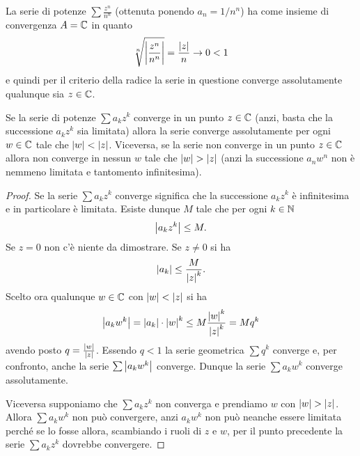\begin{example}
\label{ex:477474}
La serie di potenze $\sum \frac{z^n}{n^n}$ (ottenuta ponendo $a_n=1/n^n$)
ha come insieme di convergenza $A={\mathbb C}$
in quanto
\[
\sqrt[n]{{\left|\frac{z^n}{n^n}\right|}} = \frac{{\left|z\right|}}{n} \to 0 < 1
\]
e quindi per il criterio della radice la serie in questione converge assolutamente
qualunque sia $z\in {\mathbb C}$.
\end{example}

\begin{theorem}
\mymark{***}%
Se la serie di potenze $\sum a_k z^k$ converge in un punto $z\in {\mathbb C}$
(anzi, basta che la successione $a_k z^k$ sia limitata)
allora la serie
converge assolutamente per ogni $w\in {\mathbb C}$ tale che ${\left|w\right|}< {\left|z\right|}$.
Viceversa, se la serie non converge in un punto $z\in {\mathbb C}$
allora
non  converge in nessun $w$ tale che ${\left|w\right|} > {\left|z\right|}$ (anzi la successione
$a_n w^n$ non è nemmeno limitata e tantomento infinitesima).
\end{theorem}
%
\begin{proof}
\mymark{*}
Se la serie $\sum a_k z^k$ converge significa che la successione
$a_k z^k$ è infinitesima e in particolare è limitata.
Esiste dunque $M$ tale che per ogni $k\in {\mathbb N}$
\[
 {\left|a_k z^k\right|} \le M.
\]
Se $z=0$ non c'è niente da dimostrare.
Se $z\neq 0$ si ha
\[
 {\left|a_k\right|} \le \frac{M}{{\left|z\right|}^k}.
\]
Scelto ora qualunque $w\in {\mathbb C}$ con ${\left|w\right|} < {\left|z\right|}$ si ha
\[
  {\left|a_k w^k\right|} = {\left|a_k\right|}\cdot {\left|w\right|}^k \le M \frac{{\left|w\right|}^k}{{\left|z\right|}^k}
  = M q^k
\]
avendo posto $q = \frac{{\left|w\right|}}{{\left|z\right|}}$.
Essendo $q<1$ la serie geometrica $\sum q^k$ converge e, per confronto,
anche la serie $\sum {\left|a_k w^k\right|}$ converge.
Dunque la serie $\sum a_k w^k$ converge assolutamente.

Viceversa supponiamo che $\sum a_k z^k$ non converga
e prendiamo $w$ con ${\left|w\right|} > {\left|z\right|}$.
Allora $\sum a_k w^k$ non può convergere,
anzi $a_k w^k$ non può neanche essere limitata perché
se lo fosse allora, scambiando i ruoli di $z$ e $w$,
per il punto precedente la serie $\sum a_k z^k$ dovrebbe convergere.
\end{proof}

